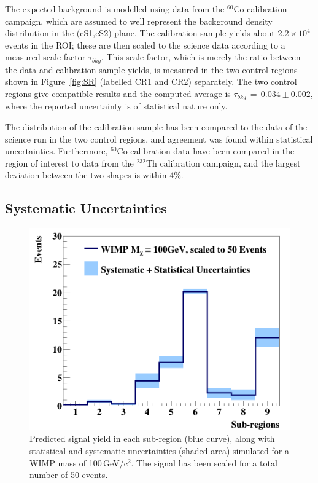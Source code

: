 The expected background is modelled using data from the $^{60}$Co calibration campaign, which are assumed to well represent the background density distribution 
in the (cS1,cS2)-plane. The calibration sample yields  about $2.2\times10^4$ events in the ROI; these are then scaled to the science data according to a measured scale 
factor $\tau_{bkg}$. This scale factor, which is merely the ratio between the data and calibration sample yields, is measured in the two control regions shown in Figure~\ref{fig:SR} (labelled CR1 and CR2) separately. The two control regions give compatible results and the computed average is $\tau_{bkg} \, =  \, 0.034 \pm 0.002 $, where the reported uncertainty 
is of statistical nature only.

The distribution of the calibration sample has been compared to the data of the science run in the two control regions,
and agreement was found within statistical uncertainties. Furthermore, $^{60}$Co calibration data have been compared in the region of interest to  
data from the $^{232}$Th calibration campaign, and the largest deviation between the two shapes is within 4\%. 




\subsection{Systematic Uncertainties}

\begin{figure}[t!]
  \includegraphics[width=\linewidth]{images/wimp_sys_unc.png}
\caption{Predicted signal yield in each sub-region (blue curve), along with statistical and systematic uncertainties (shaded area) simulated for a WIMP mass of 100\,GeV/c$^2$.  The signal has been scaled for a total number of 50 events.}
  \label{fig:unc}
\end{figure}


